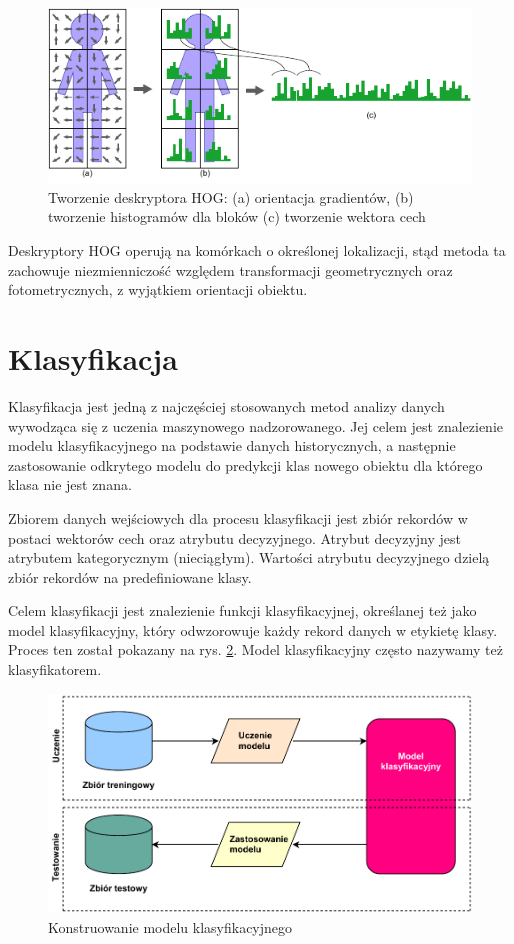 \begin{figure}[h]
	\centering
	\includegraphics[scale=1.7]{graphics/01_podstawy_teoretyczne/hog-process.pdf}
	\caption{ Tworzenie deskryptora HOG: (a) orientacja gradientów, (b) tworzenie histogramów dla bloków (c) tworzenie wektora cech }
	\label{fig:hog-process}
\end{figure}

Deskryptory HOG operują na komórkach o określonej lokalizacji, stąd metoda ta zachowuje niezmienniczość względem transformacji geometrycznych oraz fotometrycznych, z wyjątkiem orientacji obiektu.\cite{DALAL05}

\section{Klasyfikacja}
Klasyfikacja jest jedną z najczęściej stosowanych metod analizy danych wywodząca się z uczenia maszynowego nadzorowanego. Jej celem jest znalezienie modelu klasyfikacyjnego na podstawie danych historycznych, a następnie zastosowanie odkrytego modelu do predykcji klas nowego obiektu dla którego klasa nie jest znana.

Zbiorem danych wejściowych dla procesu klasyfikacji jest zbiór rekordów w postaci wektorów cech oraz atrybutu decyzyjnego. Atrybut decyzyjny jest atrybutem kategorycznym (nieciągłym). Wartości atrybutu decyzyjnego dzielą zbiór rekordów na predefiniowane klasy.

Celem klasyfikacji jest znalezienie funkcji klasyfikacyjnej, określanej też jako model klasyfikacyjny, który odwzorowuje każdy rekord danych w etykietę klasy. Proces ten został pokazany na rys. \ref{fig:classification-model}. Model klasyfikacyjny często nazywamy też klasyfikatorem.\cite{MORZY13}

\begin{figure}[h]
	\centering
	\includegraphics[scale=1.0]{graphics/01_podstawy_teoretyczne/classification-model.pdf}
	\caption{ Konstruowanie modelu klasyfikacyjnego \cite{MORZY13} }
	\label{fig:classification-model}
\end{figure}

